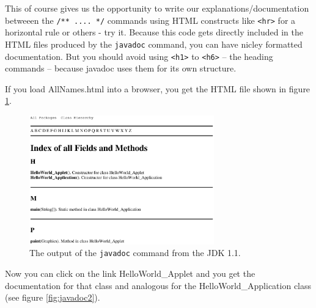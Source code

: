 This of course gives us the opportunity to write our 
explanations/documentation
betweeen the \verb|/** .... */| commands using HTML constructs like
\verb|<hr>| for a horizontal rule or others - try it. 
Because this code gets directly included in the HTML files produced by
the \verb|javadoc| command, you can have nicley formatted documentation.
But you should avoid using \verb|<h1>| to \verb|<h6>| -- the heading 
commands -- because javadoc uses them for its own structure.

If you load AllNames.html into a browser, you get the HTML file shown
in figure \ref{fig:javadoc1}.
\begin{figure}[htbp]
  \begin{center}
    \leavevmode
 \includegraphics[width=8cm]{Figures/AllNames.eps} 
    \caption{The output of the \texttt{javadoc} command from the JDK 1.1.}
    \label{fig:javadoc1}
  \end{center}
\end{figure}
Now you can click on the link HelloWorld\_Applet and you get the
documentation for that class and analogous for the HelloWorld\_Application
class (see figure \ref{fig:javadoc2}).
